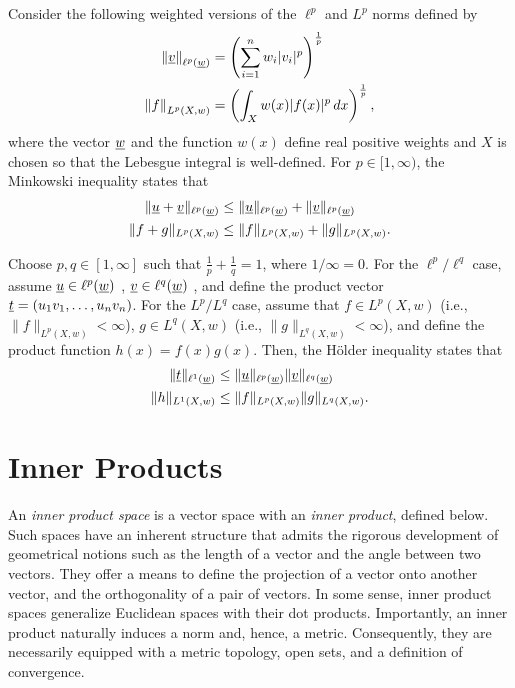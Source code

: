 \begin{theorem} \label{thm:HolderMinkowski}

Consider the following weighted versions of the $\ell^p$ and $L^p$ norms defined by
\begin{align*}
\left\| \underline{v} \right\|_{\ell^p (\underline{w})} &= \left( \sum_{i=1}^n w_i |v_i|^p \right)^{\frac{1}{p}} \\
\left\| f \right\|_{L^p (X,w)} &= \left( \int_X w(x) |f(x)|^p \, dx \right)^{\frac{1}{p}},
\end{align*}
where the vector $\underline{w}$ and the function $w(x)$ define real positive weights and $X$ is chosen so that the Lebesgue integral is well-defined.
For $p\in [1,\infty)$, the Minkowski inequality states that
\begin{align*}
\| \underline{u} + \underline{v} \|_{\ell^p (\underline{w})} &\leq \| \underline{u} \|_{\ell^p (\underline{w})} + \| \underline{v} \|_{\ell^p (\underline{w})} \\
\| f+g \|_{L^p (X,w)} &\leq \| f \|_{L^p (X,w)} + \|g \|_{L^p (X,w)}.
\end{align*}

Choose $p,q \in [1,\infty]$ such that $\frac{1}{p}+\frac{1}{q} = 1$, where $1/\infty=0$.
For the $\ell^p / \ell^q$ case, assume $\underline{u} \in \ell^p (\underline{w})$%
, $\underline{v} \in \ell^q (\underline{w}) $%
, and define the product vector $\underline{t} = (u_1 v_1,\ldots, u_n v_n)$.
For the $L^p / L^q$ case, assume that $f \in L^p (X,w)$ (i.e., $\| f \|_{L^p (X,w)} < \infty$), $g \in L^q (X,w)$ (i.e., $\| g \|_{L^q (X,w)} < \infty$), and define the product function $h(x) = f(x) g(x)$.
Then, the H\"{o}lder inequality states that
\begin{align*}
\| \underline{t} \|_{\ell^1 (\underline{w})} &\leq \| \underline{u} \|_{\ell^p (\underline{w})} \| \underline{v} \|_{\ell^q (\underline{w})} \\
\| h \|_{L^1 (X,w)} &\leq \| f \|_{L^p (X,w)} \|g \|_{L^q (X,w)}.
\end{align*}

\end{theorem}


\section{Inner Products}

An \emph{inner product space} is a vector space with an \emph{inner product}, defined below.
Such spaces have an inherent structure that admits the rigorous development of geometrical notions such as the length of a vector and the angle between two vectors.
They offer a means to define the projection of a vector onto another vector, and the orthogonality of a pair of vectors.
In some sense, inner product spaces generalize Euclidean spaces with their dot products.
Importantly, an inner product naturally induces a norm and, hence, a metric.
Consequently, they are necessarily equipped with a metric topology, open sets, and a definition of convergence.

